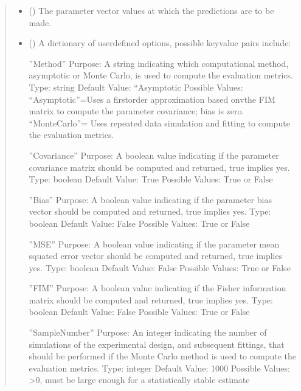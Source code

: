 \documentclass[letterpaper,10pt,english,openany,oneside]{sphinxmanual}
\begin{document}
\begin{fulllineitems}
\begin{fulllineitems}
\begin{quote}
\begin{description}
\begin{itemize}
\item {} 
 (\sphinxstyleliteralemphasis{\sphinxupquote{, }}) \textendash{} The parameter vector values at which the predictions are to be made.

\item {} 
 (\sphinxstyleliteralemphasis{\sphinxupquote{, }}) \textendash{} 
A dictionary of user\sphinxhyphen{}defined options, possible key\sphinxhyphen{}value
pairs include:

”Method” \textendash{}
Purpose: A string indicating which computational method, asymptotic or Monte Carlo,
is used to compute the evaluation metrics.
Type: string
Default Value: “Asymptotic
Possible Values: “Asymptotic”=Uses a first\sphinxhyphen{}order approximation based onvthe FIM
matrix to compute the parameter covariance; bias is zero. “MonteCarlo”= Uses
repeated data simulation and fitting to compute the evaluation metrics.

”Covariance” \textendash{}
Purpose: A boolean value indicating if the parameter covariance matrix should be
computed and returned, true implies yes.
Type: boolean
Default Value: True
Possible Values: True or False

”Bias” \textendash{}
Purpose: A boolean value indicating if the parameter bias vector should be
computed and returned, true implies yes.
Type: boolean
Default Value: False
Possible Values: True or False

”MSE” \textendash{}
Purpose: A boolean value indicating if the parameter mean squated error vector
should be computed and returned, true implies yes.
Type: boolean
Default Value: False
Possible Values: True or False

”FIM” \textendash{}
Purpose: A boolean value indicating if the Fisher information matrix
should be computed and returned, true implies yes.
Type: boolean
Default Value: False
Possible Values: True or False

”SampleNumber” \textendash{}
Purpose: An integer indicating the number of simulations of the experimental design,
and subsequent fittings, that should be performed if the Monte Carlo method is used
to compute the evaluation metrics.
Type: integer
Default Value: 1000
Possible Values: \textgreater{}0, must be large enough for a statistically stable estimate



\end{itemize}
\end{description}
\end{quote}
\end{fulllineitems}
\end{fulllineitems}
\end{document}
